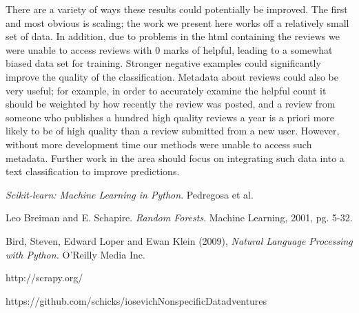 \documentclass{article}
\begin{document}
\begin{multicols}{2}
There are a variety of ways these results could potentially be improved. The first and most obvious is scaling; the work we present here works off a relatively small set of data. In addition, due to problems in the html containing the reviews we were unable to access reviews with 0 marks of helpful, leading to a somewhat biased data set for training. Stronger negative examples could significantly improve the quality of the classification. Metadata about reviews could also be very useful; for example, in order to accurately examine the helpful count it should be weighted by how recently the review was posted, and a review from someone who publishes a hundred high quality reviews a year is a priori more likely to be of high quality than a review submitted from a new user. However, without more development time our methods were unable to access such metadata. Further work in the area should focus on integrating such data into a text classification to improve predictions.
\end{multicols}

\begin{thebibliography}{9}
	 \textit{Scikit-learn: Machine Learning in Python}. Pedregosa et al.
	
	 Leo Breiman and E. Schapire. \textit{Random Forests}. Machine Learning, 2001, pg. 5-32.
	
	 Bird, Steven, Edward Loper and Ewan Klein (2009), \textit{Natural Language Processing with Python.} O’Reilly Media Inc.
	
	 http://scrapy.org/
	
	 https://github.com/schicks/iosevichNonspecificDatadventures
\end{thebibliography}
\end{document}
